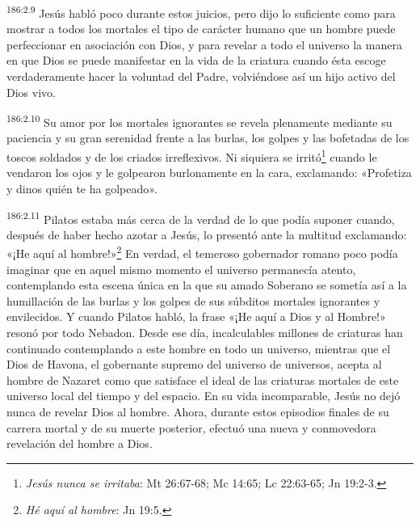 \par
\textsuperscript{186:2.9} Jesús habló poco durante estos juicios, pero dijo lo suficiente como para mostrar a todos los mortales el tipo de carácter humano que un hombre puede perfeccionar en asociación con Dios, y para revelar a todo el universo la manera en que Dios se puede manifestar en la vida de la criatura cuando ésta escoge verdaderamente hacer la voluntad del Padre, volviéndose así un hijo activo del Dios vivo.

\par
\textsuperscript{186:2.10} Su amor por los mortales ignorantes se revela plenamente mediante su paciencia y su gran serenidad frente a las burlas, los golpes y las bofetadas de los toscos soldados y de los criados irreflexivos. Ni siquiera se irritó\footnote{\textit{Jesús nunca se irritaba}: Mt 26:67-68; Mc 14:65; Lc 22:63-65; Jn 19:2-3.} cuando le vendaron los ojos y le golpearon burlonamente en la cara, exclamando: «Profetiza y dinos quién te ha golpeado».

\par
\textsuperscript{186:2.11} Pilatos estaba más cerca de la verdad de lo que podía suponer cuando, después de haber hecho azotar a Jesús, lo presentó ante la multitud exclamando: «¡He aquí al hombre!»\footnote{\textit{Hé aquí al hombre}: Jn 19:5.} En verdad, el temeroso gobernador romano poco podía imaginar que en aquel mismo momento el universo permanecía atento, contemplando esta escena única en la que su amado Soberano se sometía así a la humillación de las burlas y los golpes de sus súbditos mortales ignorantes y envilecidos. Y cuando Pilatos habló, la frase «¡He aquí a Dios y al Hombre!» resonó por todo Nebadon. Desde ese día, incalculables millones de criaturas han continuado contemplando a este hombre en todo un universo, mientras que el Dios de Havona, el gobernante supremo del universo de universos, acepta al hombre de Nazaret como que satisface el ideal de las criaturas mortales de este universo local del tiempo y del espacio. En su vida incomparable, Jesús no dejó nunca de revelar Dios al hombre. Ahora, durante estos episodios finales de su carrera mortal y de su muerte posterior, efectuó una nueva y conmovedora revelación del hombre a Dios.

